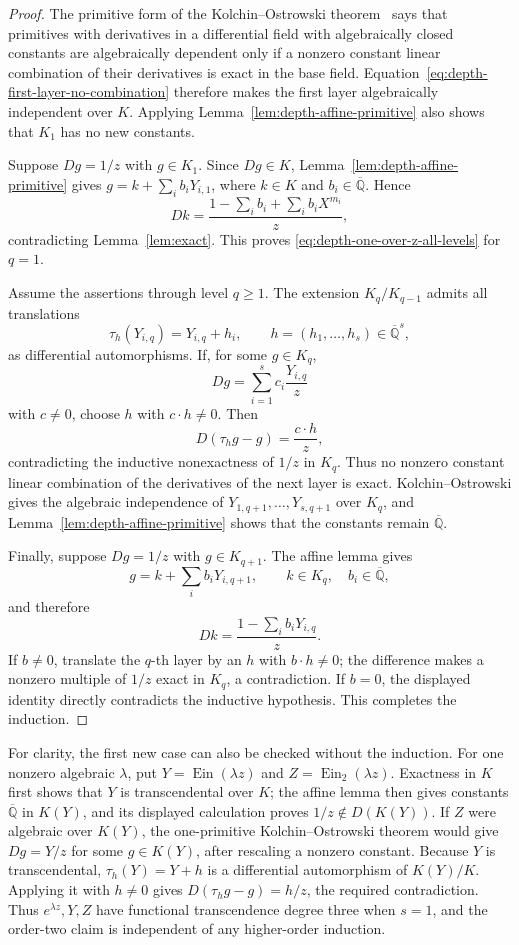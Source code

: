 \documentclass[11pt]{article}
\theoremstyle{definition}
\theoremstyle{remark}
\newcommand{\Qbar}{\overline{\mathbb Q}}
\newcommand{\Ein}{\operatorname{Ein}}
\newcommand{\EinDepth}[1]{\operatorname{Ein}_{#1}}
\begin{document}
\begin{proof}
The primitive form of the Kolchin--Ostrowski theorem~\cite{Kolchin} says that primitives
with derivatives in a differential field with algebraically closed
constants are algebraically dependent only if a nonzero constant linear
combination of their derivatives is exact in the base field.
Equation~\eqref{eq:depth-first-layer-no-combination} therefore makes the
first layer algebraically independent over \(K\).  Applying
Lemma~\ref{lem:depth-affine-primitive} also shows that \(K_1\) has no new
constants.

Suppose \(Dg=1/z\) with \(g\in K_1\).  Since \(Dg\in K\),
Lemma~\ref{lem:depth-affine-primitive} gives
\(g=k+\sum_i b_iY_{i,1}\), where \(k\in K\) and
\(b_i\in\Qbar\).  Hence
\[
 Dk=\frac{1-\sum_i b_i+\sum_i b_iX^{m_i}}z,
\]
contradicting Lemma~\ref{lem:exact}.  This proves
\eqref{eq:depth-one-over-z-all-levels} for \(q=1\).

Assume the assertions through level \(q\geq1\).  The extension
\(K_q/K_{q-1}\) admits all translations
\[
 \tau_h(Y_{i,q})=Y_{i,q}+h_i,\qquad
 h=(h_1,\ldots,h_s)\in\Qbar^s,
\]
as differential automorphisms.  If, for some \(g\in K_q\),
\[
 Dg=\sum_{i=1}^s c_i\frac{Y_{i,q}}z
\]
with \(c\ne0\), choose \(h\) with \(c\mathbin{\cdot}h\ne0\).  Then
\[
 D(\tau_hg-g)=\frac{c\mathbin{\cdot}h}{z},
\]
contradicting the inductive nonexactness of \(1/z\) in \(K_q\).
Thus no nonzero constant linear combination of the derivatives of the
next layer is exact.  Kolchin--Ostrowski gives the algebraic independence
of \(Y_{1,q+1},\ldots,Y_{s,q+1}\) over \(K_q\), and
Lemma~\ref{lem:depth-affine-primitive} shows that the constants remain
\(\Qbar\).

Finally, suppose \(Dg=1/z\) with \(g\in K_{q+1}\).  The affine lemma gives
\[
 g=k+\sum_i b_iY_{i,q+1},\qquad
 k\in K_q,\quad b_i\in\Qbar,
\]
and therefore
\[
 Dk=\frac{1-\sum_i b_iY_{i,q}}z.
\]
If \(b\ne0\), translate the \(q\)-th layer by an \(h\) with
\(b\mathbin{\cdot}h\ne0\); the difference makes a nonzero multiple of
\(1/z\) exact in \(K_q\), a contradiction.  If \(b=0\), the displayed
identity directly contradicts the inductive hypothesis.  This completes
the induction.
\end{proof}

For clarity, the first new case can also be checked without the induction.
For one nonzero algebraic \(\lambda\), put
\(Y=\Ein(\lambda z)\) and
\(Z=\EinDepth{2}(\lambda z)\).  Exactness in \(K\) first shows that
\(Y\) is transcendental over \(K\); the affine lemma then gives constants
\(\Qbar\) in \(K(Y)\), and its displayed calculation proves
\(1/z\notin D(K(Y))\).  If \(Z\) were algebraic over \(K(Y)\), the
one-primitive Kolchin--Ostrowski theorem would give
\(Dg=Y/z\) for some \(g\in K(Y)\), after rescaling a nonzero constant.
Because \(Y\) is transcendental, \(\tau_h(Y)=Y+h\) is a differential
automorphism of \(K(Y)/K\).  Applying it with \(h\ne0\) gives
\(D(\tau_hg-g)=h/z\), the required contradiction.  Thus
\(e^{\lambda z},Y,Z\) have functional transcendence degree three when
\(s=1\), and the order-two claim is independent of any higher-order
induction.
\end{document}
